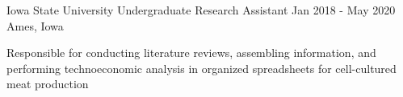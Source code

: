 \begin{cventries}
{\begin{cvitems}
      \end{cvitems}
    }
\vspace*{.5cm}
 \cventry
    {Iowa State University} %
    {Undergraduate Research Assistant} %
    {Jan 2018 - May 2020} %
    {Ames, Iowa} %
    {
      \begin{cvitems} %
      \setlength\itemsep{.4em}
        \item {Responsible for conducting literature reviews, assembling information, and performing technoeconomic analysis in organized spreadsheets for cell-cultured meat production}
      \end{cvitems}
    }

\end{cventries}

